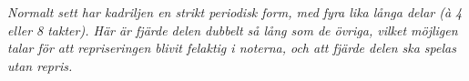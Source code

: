 \vspace{5mm}
\textit{Normalt sett har kadriljen en strikt periodisk form, med fyra lika långa delar (à 4 eller 8 takter).
Här är fjärde delen dubbelt så lång som de övriga, vilket möjligen talar för att repriseringen blivit
felaktig i noterna, och att fjärde delen ska spelas utan repris.}